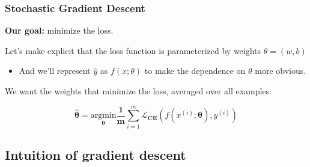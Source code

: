 \documentclass[13.5pt,aspecratio=169]{beamer}
\begin{document}
\begin{frame}
	\frametitle{Stochastic Gradient Descent}
	\begin{block}{} %
		\textbf{Our goal:} minimize the loss.
	\end{block}
    
    \begin{block}{} %
        Let's make explicit that the loss function is parameterized by weights $\theta = (w,b)$
	\end{block}
    \begin{itemize}
        \item And we'll represent $\hat{y}$ as \textit{$f(x; \theta)$} to make the dependence on $\theta$ more obvious.
	\end{itemize}

    \begin{block}{} %
        We want the weights that minimize the loss, averaged over all examples:
	\end{block}
    {\fontsize{16}{20}\selectfont
    \begin{center} %
        \[ \bm{\hat{\theta}} =  \underset{\bm{\theta}}{\text{argmin}} \frac{\bm{1}}{\bm{m}} \sum_{i=1}^{m} \bm{\mathcal{L}}_{\bm{CE}}(f(x^{(i)}; \bm{\theta}), y^{(i)})\]
      \end{center}
    }

\end{frame}



\subsection{Intuition of gradient descent}
\end{document}
